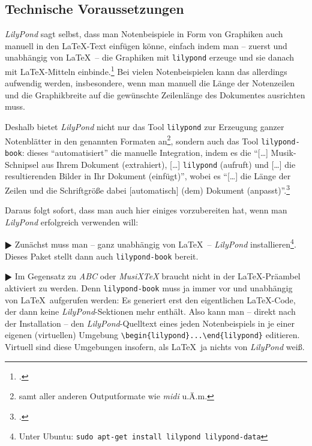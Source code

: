 \subsection{Technische Voraussetzungen}

\textit{LilyPond} sagt selbst, dass man Notenbeispiele in Form von Graphiken auch
manuell in den \LaTeX-Text einfügen könne, einfach indem man -- zuerst und
unabhängig von \LaTeX\ -- die Graphiken mit \texttt{lilypond} erzeuge und sie
danach mit \LaTeX-Mitteln einbinde.\footcite[vgl.][20]{LilyPond2018e} Bei vielen
Notenbeispielen kann das allerdings aufwendig werden, insbesondere, wenn man
manuell die Länge der Notenzeilen und die Graphikbreite auf die gewünschte
Zeilenlänge des Dokumentes ausrichten muss.

Deshalb bietet \textit{LilyPond} nicht nur das Tool \texttt{lilypond} zur
Erzeugung ganzer Notenblätter in den genannten Formaten an\footnote{samt aller
anderen Outputformate wie \textit{midi} u.Ä.m.}, sondern auch das Tool
\texttt{lilypond-book}: dieses \enquote{automatisiert} die manuelle Integration,
indem es die \enquote{[\ldots] Musik-Schnipsel aus Ihrem Dokument (extrahiert),
[\ldots] \texttt{lilypond} (aufruft) und [\ldots] die resultierenden Bilder in
Ihr Dokument (einfügt)}, wobei es \enquote{[\ldots] die Länge der Zeilen und die
Schriftgröße dabei [automatisch] (dem) Dokument
(anpasst)}.\footcite[vgl.][20]{LilyPond2018e}

Daraus folgt sofort, dass man auch hier einiges vorzubereiten hat, wenn man
\textit{LilyPond} erfolgreich verwenden will:

$\RHD$ Zunächst muss man -- ganz unabhängig von \LaTeX\ -- \textit{LilyPond}
installieren\footnote{Unter Ubuntu: \texttt{sudo apt-get install lilypond
lilypond-data}}. Dieses Paket stellt dann auch \texttt{lilypond-book} bereit.
  
$\RHD$ Im Gegensatz zu \textit{ABC} oder \textit{MusiX\TeX} braucht
 nicht in der \LaTeX-Präambel aktiviert zu werden. Denn
\texttt{lilypond-book} muss ja immer vor und unabhängig von \LaTeX\
aufgerufen werden: Es generiert erst den eigentlichen \LaTeX-Code, der dann
keine \textit{LilyPond}-Sektionen mehr enthält. Also kann man -- direkt nach der
Installation -- den \textit{LilyPond}-Quelltext eines jeden Notenbeispiels in je
einer eigenen (virtuellen) Umgebung \verb|\begin{lilypond}...\end{lilypond}|
editieren. Virtuell sind diese Umgebungen insofern, als \LaTeX\ ja nichts von
\textit{LilyPond} weiß.

